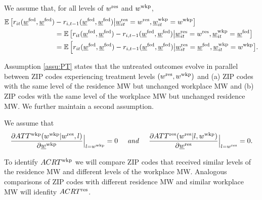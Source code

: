 \begin{assu} \label{assu:PT}
    We assume that, for all levels of $w^{\text{res}}$ and $w^{\text{wkp}}$,
    \begin{align*}\label{eq:PT}
        \operatorname{\mathbb{E}}\big[r_{it}(\underline{w}^{\text{fed}}, \underline{w}^{\text{fed}}) & - r_{i,t-1}(\underline{w}^{\text{fed}}, \underline{w}^{\text{fed}}) 
                \big| \underline{w}_{it}^{\text{res}}=w^{\text{res}}, \underline{w}_{it}^{\text{wkp}}=w^{\text{wkp}} \big] \\
        & = \operatorname{\mathbb{E}}\big[r_{it}(\underline{w}^{\text{fed}}, \underline{w}^{\text{fed}}) - r_{i,t-1}(\underline{w}^{\text{fed}}, \underline{w}^{\text{fed}})
                \big| \underline{w}_{it}^{\text{res}}=w^{\text{res}}, \underline{w}_{it}^{\text{wkp}}=\underline{w}^{\text{fed}} \big] \\
        & = \operatorname{\mathbb{E}}\Big[r_{it}(\underline{w}^{\text{fed}}, \underline{w}^{\text{fed}}) - r_{i,t-1}(\underline{w}^{\text{fed}}, \underline{w}^{\text{fed}})
                \big| \underline{w}_{it}^{\text{res}}=\underline{w}^{\text{fed}}, \underline{w}_{it}^{\text{wkp}}=w^{\text{wkp}} \big] .
    \end{align*}
\end{assu}

Assumption \ref{assu:PT} states that the untreated outcomes evolve in parallel 
between ZIP codes experiencing treatment levels $(w^{\text{res}},w^{\text{wkp}})$ and 
(a) ZIP codes with the same level of the residence MW but unchanged workplace MW and
(b) ZIP codes with the same level of the workplace MW but unchanged residence MW.
We further maintain a second assumption.

\begin{assu} \label{assu:no_selection}
    We assume that
    \begin{equation*}\label{eq:no_selection_workplace}
        \frac{\partial ATT^{\text{wkp}}(w^{\text{wkp}} | w^{\text{res}}, l)}
             {\partial \underline{w}^{\text{wkp}}} \Big|_{l = w^{\text{wkp}}} = 0
        \quad\text{\textit{ and }}\quad
        \frac{\partial ATT^{\text{res}}(w^{\text{res}} | l, w^{\text{wkp}})}
             {\partial \underline{w}^{\text{res}}} \Big|_{l = w^{\text{res}}} = 0 .
    \end{equation*}
\end{assu}

To identify $ACRT^{\text{wkp}}$ we will compare ZIP codes that received similar levels 
of the residence MW and different levels of the workplace MW.
Analogous comparisons of ZIP codes with different residence MW and similar 
workplace MW will idenfity $ACRT^{\text{res}}$.

